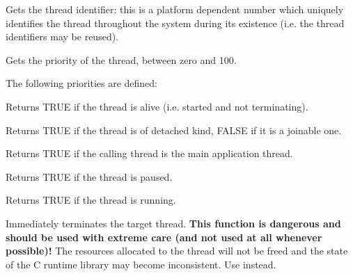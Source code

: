 
Gets the thread identifier: this is a platform dependent number which uniquely identifies the
thread throughout the system during its existence (i.e. the thread identifiers may be reused).

\label{wxthreadgetpriority}


Gets the priority of the thread, between zero and 100.

The following priorities are defined:

\twocolwidtha{7cm}
\begin{twocollist}\itemsep=0pt
\end{twocollist}

\label{wxthreadisalive}


Returns TRUE if the thread is alive (i.e. started and not terminating).

\label{wxthreadisdetached}


Returns TRUE if the thread is of detached kind, FALSE if it is a joinable one.

\label{wxthreadismain}


Returns TRUE if the calling thread is the main application thread.

\label{wxthreadispaused}


Returns TRUE if the thread is paused.

\label{wxthreadisrunning}


Returns TRUE if the thread is running.

\label{wxthreadkill}


Immediately terminates the target thread. {\bf This function is dangerous and should
be used with extreme care (and not used at all whenever possible)!} The resources
allocated to the thread will not be freed and the state of the C runtime library
may become inconsistent. Use  instead.


